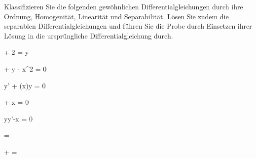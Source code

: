 \begin{atiTask}[
	title = Klassifikation von gewöhnlichen Differentialgleichungen,
	language = Deutsch,
]
	Klassifizieren Sie die folgenden gewöhnlichen Differentialgleichungen durch ihre Ordnung, Homogenität, Linearität und Separabilität.
	Lösen Sie zudem die separablen Differentialgleichungen und führen Sie die Probe durch Einsetzen ihrer Lösung in die ursprüngliche Differentialgleichung durch.
	\begin{atiSubequations}
	\begin{multicols}{2}
		\item{
			 + 2 = y
		}
		\item{
			 + \sin y - x^2 = 0
		}
		\item{
			y' + \tan(x)\cdot y = 0
		}
		\item{
			 + x = 0
		}
		\item{
			yy'-x = 0
		}
		\item{
			 = 
		}
	\end{multicols}
		\item{
			 +  = 
		}
	\end{atiSubequations}
\end{atiTask}